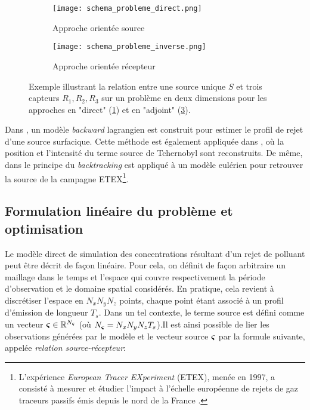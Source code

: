  \begin{figure}[h]
 	\begin{subfigure}{0.5\textwidth}
 		\texttt{[image: schema\_probleme\_direct.png]}
 		\caption{Approche orientée source}
 		\label{schema_probleme_direct}
 	\end{subfigure}
 	\begin{subfigure}{0.5\textwidth}
 		\texttt{[image: schema\_probleme\_inverse.png]}
 		\caption{Approche orientée récepteur}
 		\label{schema_probleme_inverse}
 	\end{subfigure}
 	\caption{Exemple illustrant la relation entre une source unique $S$ et trois capteurs $R_1,R_2,R_3$ sur un problème en deux dimensions pour les approches en "direct" (\ref{schema_probleme_direct}) et en "adjoint" (\ref{schema_probleme_inverse}). }
 \end{figure}
 
 Dans \cite{Flesch1995}, un modèle \textit{backward} lagrangien est construit pour estimer le profil de rejet d'une source surfacique.  Cette méthode est également appliquée dans \cite{Pudykiewicz1998}, où la position et l'intensité du terme source de Tchernobyl sont reconstruits. De même, dans \cite{Hourdin2006b} le principe du \textit{backtracking} est appliqué à un modèle eulérien pour retrouver la source de la campagne ETEX\footnote{L’expérience \textit{European Tracer EXperiment} (ETEX), menée en 1997,  a consisté à mesurer et étudier l'impact à l'échelle européenne de rejets de gaz traceurs passifs émis depuis le nord de la France \cite{Nodop1998}.}.\\
 
 \subsection{Formulation linéaire du problème et optimisation}
 \label{subsection_MCO}
 
Le modèle direct de simulation des concentrations résultant d'un rejet de polluant peut être décrit de façon linéaire. Pour cela, on définit de façon arbitraire un maillage dans le temps et l'espace qui couvre respectivement la période d'observation et le domaine spatial considérés. En pratique, cela revient à discrétiser l'espace en $N_xN_yN_z$ points, chaque point étant associé à un profil d'émission de longueur $T_s$. Dans un tel contexte, le terme source est défini comme un vecteur ${\bm{\varsigma}} \in \mathbb{R}^{N_{\bm{\varsigma}}}$ (où $N_{\bm{\varsigma}} = N_xN_yN_zT_s$).Il est ainsi possible de lier les observations générées par le modèle et le vecteur source ${\bm{\varsigma}}$ par la formule suivante, appelée \textit{relation source-récepteur}:

